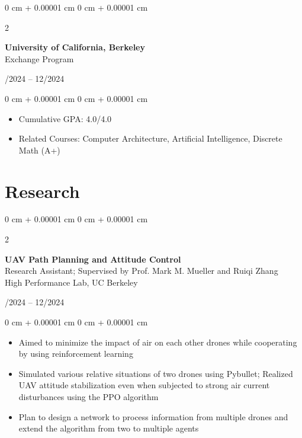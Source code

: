 \documentclass[10pt, letterpaper]{article}
\newenvironment{highlights}{
    \begin{itemize}[
        topsep=0.10 cm,
        parsep=0.10 cm,
        partopsep=0pt,
        itemsep=0pt,
        leftmargin=0 cm + 10pt
    ]
}{
    \end{itemize}
} %
\newenvironment{onecolentry}{
    \begin{adjustwidth}{
        0 cm + 0.00001 cm
    }{
        0 cm + 0.00001 cm
    }
}{
    \end{adjustwidth}
} %
\newenvironment{twocolentry}[2][]{
    \onecolentry
    \def\secondColumn{#2}
    \setcolumnwidth{\fill, 4.5 cm}
    \begin{paracol}{2}
}{
    \switchcolumn \raggedleft \secondColumn
    \end{paracol}
    \endonecolentry
} %
\begin{document}
        \vspace{0.2 cm}

        \begin{twocolentry}{
            08/2024 -- 12/2024
        }
            \textbf{University of California, Berkeley}\\
            Exchange Program
        \end{twocolentry}

        \vspace{0.10 cm}
        \begin{onecolentry}
            \begin{highlights}
                \item Cumulative GPA: 4.0/4.0
                \item Related Courses: Computer Architecture, Artificial Intelligence, Discrete Math (A+)
            \end{highlights}
        \end{onecolentry}



    
    \section{Research}

        \begin{twocolentry}{
            09/2024 -- 12/2024
        }
            \textbf{UAV Path Planning and Attitude Control}\\
            Research Assistant; Supervised by Prof. Mark M. Mueller and Ruiqi Zhang\\
            High Performance Lab, UC Berkeley
        \end{twocolentry}

        \vspace{0.10 cm}
        \begin{onecolentry}
            \begin{highlights}
                \item Aimed to minimize the impact of air on each other drones while cooperating by using reinforcement learning
                \item Simulated various relative situations of two drones using Pybullet; Realized UAV attitude stabilization even when subjected to strong air current disturbances using the PPO algorithm
                \item Plan to design a network to process information from multiple drones and extend the algorithm from two to multiple agents
            \end{highlights}
        \end{onecolentry}
\end{document}
